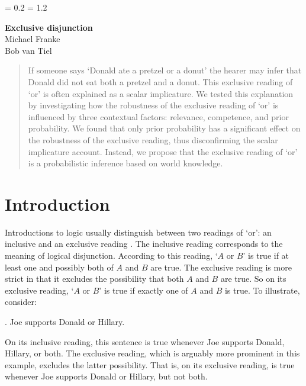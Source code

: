 \documentclass[12pt]{article}
\begin{document}
\Exlabelsep = 0.2\parindent
\SubExleftmargin = 1.2\parindent

\begin{center}
\noindent\LARGE \textbf{Exclusive disjunction} \\[.5cm]
\large Michael Franke\\[.1cm] 
\large Bob van Tiel
\end{center}

\begin{abstract}
If someone says `Donald ate a pretzel or a donut' the hearer may infer that Donald did not eat both a pretzel and a donut. This exclusive reading of `or' is often explained as a scalar implicature. We tested this explanation by investigating how the robustness of the exclusive reading of `or' is influenced by three contextual factors: relevance, competence, and prior probability. We found that only prior probability has a significant effect on the robustness of the exclusive reading, thus disconfirming the scalar implicature account. Instead, we propose that the exclusive reading of `or' is a probabilistic inference based on world knowledge.
\end{abstract}

\section{Introduction}

Introductions to logic usually distinguish between two readings of `or': an inclusive and an exclusive reading \citep[e.g.,][]{mccawley1981, copi2005}. The inclusive reading corresponds to the meaning of logical disjunction. According to this reading, `$A$ or $B$' is true if at least one and possibly both of $A$ and $B$ are true. The exclusive reading is more strict in that it excludes the possibility that both $A$ and $B$ are true. So on its exclusive reading, `$A$ or $B$' is true if exactly one of $A$ and $B$ is true. To illustrate, consider:

\ex.	\label{ex:support} Joe supports Donald or Hillary.

On its inclusive reading, this sentence is true whenever Joe supports Donald, Hillary, or both. The exclusive reading, which is arguably more prominent in this example, excludes the latter possibility. That is, on its exclusive reading, \Last is true whenever Joe supports Donald or Hillary, but not both.
\end{document}
